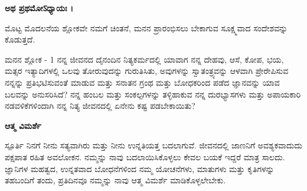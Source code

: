 \centerline{\textbf{ಅಥ ಪ್ರಥಮೋऽಧ್ಯಾಯಃ ।}\\}
ಮೊಟ್ಟ ಮೊದಲನೆಯ ಶ್ಲೋಕವೇ ನಮಗೆ ಚಿಂತನೆ, ಮನನ ಪ್ರಾರಂಭಿಸಲು ಬೇಕಾಗುವ ಸೂಕ್ಷ್ಮವಾದ ಸಂದೇಶವನ್ನು ಕೊಡುತ್ತದೆ.\\

\newpage
\begin{mananam}{\kanfont ಮನನ ಶ್ಲೋಕ - \textenglish{1}}
{\footnotesize \mananamfont ನನ್ನ ಜೀವನದ ದೈನಂದಿನ ನಿತ್ಯಕರ್ಮದಲ್ಲಿ ಯಾವಾಗ ನನ್ನ ದೇಹವು, ಆಸೆ, ಕೋಪ, ಭಯ, ಮತ್ಸರ ಇತ್ಯಾದಿಗಳಲ್ಲಿ ಒಲವು ತೋರುವುದನ್ನು ಗುರುತಿಸಿತು, ಅವುಗಳನ್ನು ಸ್ವಾತಂತ್ರ್ಯವನ್ನು ಆಳವಾಗಿ ಪ್ರೇರೇಪಿಸುವ ನನ್ನನ್ನು ಪ್ರತಿಭಟಿಸುವಂತೆ ಮಾಡುವ ಮತ್ತು ಸನಾತನ ಗ್ರಂಥ ಮತ್ತು ಬೋಧಕರಿಂದ ಪಡೆದ ಜ್ಞಾನವನ್ನು ಯಾವ ಬಲವನ್ನು ಅನುಸರಿಸಿದೆ? ನನ್ನ ಹಂಬಲ ಮತ್ತು ಸಂಕಲ್ಪಗಳನ್ನು ತಳ್ಳಿಹಾಕುವ ನನ್ನ ದುರಭ್ಯಾಸಗಳು ಮತ್ತು ಅಪಾಯಕಾರಿ ನಡವಳಿಕೆಗಳಿಂದಾಗಿ ನನ್ನ ನಿತ್ಯ ಜೀವನದಲ್ಲಿ ಏನೇನು ಕಷ್ಟ ಪಡಬೇಕಾಯಿತು?}
\end{mananam}
\WritingHand\enspace\textbf{ಆತ್ಮ ವಿಮರ್ಶೆ}
\begin{inspiration}{\kanfont ಸ್ಪೂರ್ತಿ}
{\footnotesize \mananamfont ನಿನಗೆ ನೀನು ಸತ್ಯವಾಗಿರು ಮತ್ತು ನೀನು ಉನ್ನತಿಯತ್ತ ಬದಲಾಗುವೆ. ಜೀವನದಲ್ಲಿ ಜಾಣನಿಗೆ ಅವಶ್ಯಕವಾದುದು ಪಕ್ಷಪಾತ ರಹಿತ ಅವಲೋಕನ. ನಮ್ಮನ್ನು ನಾವು ಬದಲಾಯಿಸಿಕೊಳ್ಳಲು ಕೇವಲ ಬಯಕೆ ಇದ್ದರೆ ಮಾತ್ರ ಸಾಲದು. ಜ್ಞಾನಿಗಳ ಮಹತ್ವದ, ಉನ್ನತವಾದ ಬೋಧನೆಗಳಿಂದ ನಮ್ಮ ಯೋಚನೆಗಳು, ಮಾತುಗಳು ಮತ್ತು ಕೃತಿಗಳನ್ನು ತಹಬಂದಿಗೆ ತಂದು, ಪ್ರತಿದಿನವೂ ನಮ್ಮನ್ನು ನಾವು ಆತ್ಮ ವಿಮರ್ಶೆ ಮಾಡಿಕೊಳ್ಳಲೇಬೇಕು.}
\end{inspiration}
\newpage

